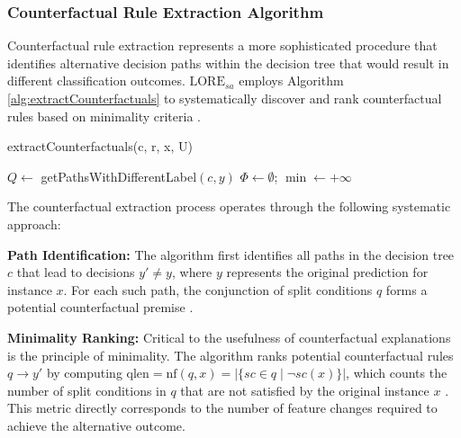 \subsubsection{Counterfactual Rule Extraction Algorithm}

Counterfactual rule extraction represents a more sophisticated procedure that identifies alternative decision paths within the decision tree that would result in different classification outcomes. $\text{LORE}_{sa}$ employs Algorithm \ref{alg:extractCounterfactuals} to systematically discover and rank counterfactual rules based on minimality criteria \cite{guidotti2022stable}.

\begin{algorithm}[ht]
\caption{extractCounterfactuals(c, r, x, U)}
\label{alg:extractCounterfactuals}
$Q \leftarrow$ getPathsWithDifferentLabel$(c, y)$ 
$\Phi \leftarrow \emptyset$; $\min \leftarrow +\infty$ 
\Return{$\Phi$}\;
\end{algorithm}

The counterfactual extraction process operates through the following systematic approach:

\textbf{Path Identification:} The algorithm first identifies all paths in the decision tree $c$ that lead to decisions $y' \neq y$, where $y$ represents the original prediction for instance $x$. For each such path, the conjunction of split conditions $q$ forms a potential counterfactual premise \cite{guidotti2022stable}.

\textbf{Minimality Ranking:} Critical to the usefulness of counterfactual explanations is the principle of minimality. The algorithm ranks potential counterfactual rules $q \rightarrow y'$ by computing $\text{qlen} = \text{nf}(q, x) = |\{sc \in q \mid \neg sc(x)\}|$, which counts the number of split conditions in $q$ that are not satisfied by the original instance $x$ \cite{guidotti2022stable}. This metric directly corresponds to the number of feature changes required to achieve the alternative outcome.

